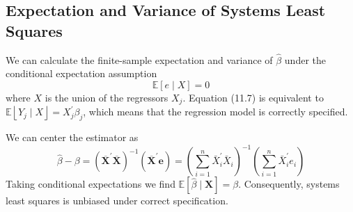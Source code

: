 \documentclass[10pt]{article}
\begin{document}
\subsection{Expectation and Variance of Systems Least Squares}
We can calculate the finite-sample expectation and variance of $\widehat{\beta}$ under the conditional expectation assumption
$$
\mathbb{E}[e \mid X]=0
$$
where $X$ is the union of the regressors $X_{j}$. Equation (11.7) is equivalent to $\mathbb{E}\left\lfloor Y_{j} \mid X\right\rfloor=X_{j}^{\prime} \beta_{j}$, which means that the regression model is correctly specified.

We can center the estimator as
$$
\widehat{\beta}-\beta=\left(\overline{\boldsymbol{X}}^{\prime} \overline{\boldsymbol{X}}\right)^{-1}\left(\overline{\boldsymbol{X}}^{\prime} \boldsymbol{e}\right)=\left(\sum_{i=1}^{n} \bar{X}_{i}^{\prime} \bar{X}_{i}\right)^{-1}\left(\sum_{i=1}^{n} \bar{X}_{i}^{\prime} e_{i}\right)
$$
Taking conditional expectations we find $\mathbb{E}[\widehat{\beta} \mid \boldsymbol{X}]=\beta$. Consequently, systems least squares is unbiased under correct specification.
\end{document}
